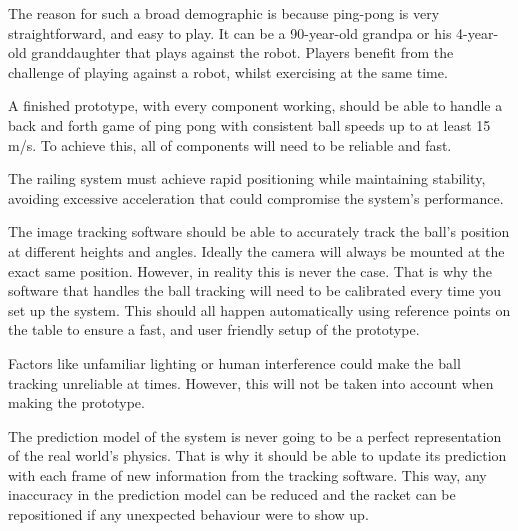 The reason for such a broad demographic is because ping-pong is very straightforward, and easy to play. It can be a 90-year-old grandpa or his 4-year-old granddaughter that plays against the robot. Players benefit from the challenge of playing against a robot, whilst exercising at the same time.

A finished prototype, with every component working, should be able to handle a back and forth game of ping pong with consistent ball speeds up to at least 15 m/s. To achieve this, all of components will need to be reliable and fast.

The railing system must achieve rapid positioning while maintaining stability, avoiding excessive acceleration that could compromise the system's performance.

The image tracking software should be able to accurately track the ball's position at different heights and angles. Ideally the camera will always be mounted at the exact same position. However, in reality this is never the case. That is why the software that handles the ball tracking will need to be calibrated every time you set up the system. This should all happen automatically using reference points on the table to ensure a fast, and user friendly setup of the prototype.

Factors like unfamiliar lighting or human interference could make the ball tracking unreliable at times. However, this will not be taken into account when making the prototype.

The prediction model of the system is never going to be a perfect representation of the real world's physics. That is why it should be able to update its prediction with each frame of new information from the tracking software. This way, any inaccuracy in the prediction model can be reduced and the racket can be repositioned if any unexpected behaviour were to show up.